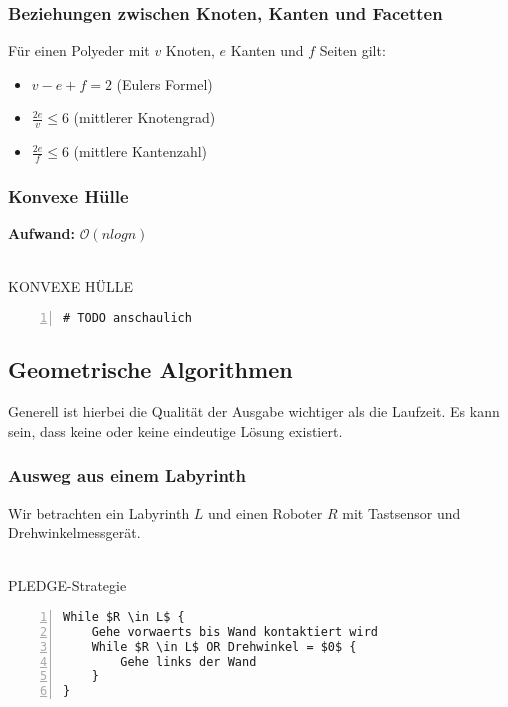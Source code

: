 \subsubsection{Beziehungen zwischen Knoten, Kanten und Facetten}
Für einen Polyeder mit \(v\) Knoten, \(e\) Kanten und \(f\) Seiten gilt:
\begin{itemize}
	\item \(v-e+f=2\) (Eulers Formel)
	\item \(\frac{2e}{v} \leq 6\) (mittlerer Knotengrad)
	\item \(\frac{2e}{f} \leq 6\) (mittlere Kantenzahl)
\end{itemize}

\subsubsection{Konvexe Hülle}
\textbf{Aufwand: } \(\mathcal{O}(nlogn)\)
\\\\
\begin{minipage}{\textwidth}
KONVEXE HÜLLE
\begin{lstlisting}[frame=single,numbers=left,mathescape]
# TODO anschaulich
\end{lstlisting}
\end{minipage}


\subsection{Geometrische Algorithmen}
Generell ist hierbei die Qualität der Ausgabe wichtiger als die Laufzeit. Es kann sein, dass keine oder keine eindeutige Lösung existiert.

\subsubsection{Ausweg aus einem Labyrinth}
Wir betrachten ein Labyrinth \(L\) und einen Roboter \(R\) mit Tastsensor und Drehwinkelmessgerät.
\\\\
\begin{minipage}{\textwidth}
PLEDGE-Strategie
\begin{lstlisting}[frame=single,numbers=left,mathescape]
While $R \in L$ {
	Gehe vorwaerts bis Wand kontaktiert wird
	While $R \in L$ OR Drehwinkel = $0$ {
		Gehe links der Wand
	}
}
\end{lstlisting}
\end{minipage}


